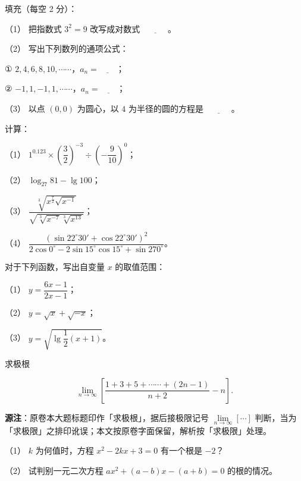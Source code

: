 \begin{question}
填充（每空 2 分）：

（1） 把指数式 $3^2=9$ 改写成对数式 $\underline{\hspace{3em}}$。

（2） 写出下列数列的通项公式：

① $2,4,6,8,10,\cdots\cdots$，$a_n=\underline{\hspace{2em}}$；

② $-1,1,-1,1,\cdots\cdots$，$a_n=\underline{\hspace{2em}}$；

（3） 以点 $(0,0)$ 为圆心，以 $4$ 为半径的圆的方程是 $\underline{\hspace{3em}}$。

\end{question}
\begin{question}
计算：

（1） $1^{0.123}\times\left(\dfrac32\right)^{-3}\div\left(-\dfrac9{10}\right)^0$；

（2） $\log_{27}81-\lg100$；

（3） $\dfrac{\sqrt[3]{x^{\frac72}\sqrt{x^{-1}}}}{\sqrt{\sqrt[3]{x^{-7}}\sqrt[3]{x^{13}}}}$；

（4） $\dfrac{\left(\sin22^\circ30'+\cos22^\circ30'\right)^2}{2\cos0^\circ-2\sin15^\circ\cos15^\circ+\sin270^\circ}$。

\end{question}
\begin{question}
对于下列函数，写出自变量 $x$ 的取值范围：

（1） $y=\dfrac{6x-1}{2x-1}$；

（2） $y=\sqrt{x}+\sqrt{-x}$；

（3） $y=\sqrt{\lg\dfrac12(x+1)}$。

\end{question}
\begin{question}
求极根

\nopagebreak[4]
\[
\lim_{n\to\infty}\left[\frac{1+3+5+\cdots\cdots+(2n-1)}{n+2}-n\right].
\]

\begin{gktip}
\textbf{源注}：原卷本大题标题印作「求极根」，据后接极限记号 $\lim\limits_{n\to\infty}[\cdots]$ 判断，当为「求极限」之排印讹误；本文按原卷字面保留，解析按「求极限」处理。
\end{gktip}

\end{question}
\begin{question}

（1） $k$ 为何值时，方程 $x^2-2kx+3=0$ 有一个根是 $-2$？

（2） 试判别一元二次方程 $ax^2+(a-b)x-(a+b)=0$ 的根的情况。

\Needspace{0.4\textheight}
\end{question}
